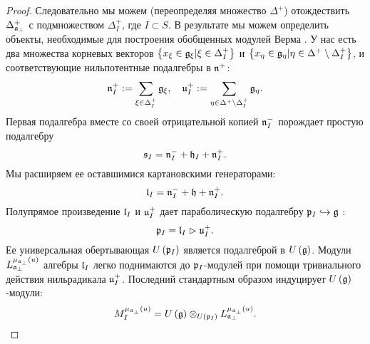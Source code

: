 \begin{proof}
Следовательно мы можем (переопределяя множество  $\Delta ^{+}$) отождествить $\Delta _{\frak{a}_{\perp }}^{+}$ с подмножеством  $\Delta _{I}^{+}$, где $I\subset S$. В результате мы можем определить объекты, необходимые для построения обобщенных модулей Верма \cite{lepowsky1977generalization,humphreys2008representations}. У нас есть два множества корневых векторов $\left\{ x_{\xi }\in \frak{g}_{\xi }|\xi \in \Delta _{I}^{+}\right\}
$ и $\left\{ x_{\eta }\in \frak{g}_{\eta }|\eta \in \Delta ^{+}\setminus
\Delta _{I}^{+}\right\} $, и соответствующие нильпотентные подалгебры в  $\frak{n}%
^{+}$:
\begin{equation*}
\frak{n}_{I}^{+}:=\sum_{\xi \in \Delta _{I}^{+}}\frak{g}_{\xi },\quad
\frak{u}_{I}^{+}:=\sum_{\eta \in \Delta ^{+}\setminus \Delta _{I}^{+}}\frak{g}%
_{\eta }.
\end{equation*}
Первая подалгебра вместе со своей отрицательной копией  $\frak{n}%
_{I}^{-} $ порождает простую подалгебру 
\begin{equation*}
\frak{s}_{I}=\frak{n}_{I}^{-}+\frak{h}_{I}+\frak{n}_{I}^{+}.
\end{equation*}
Мы расширяем ее оставшимися картановскими генераторами:
\begin{equation*}
\frak{l}_{I}=\frak{n}_{I}^{-}+\frak{h}+\frak{n}_{I}^{+}.
\end{equation*}
Полупрямое произведение  $\frak{l}_{I}$ и $\frak{u}_{I}^{+}$ дает параболическую подалгебру $\frak{p}_{I}\hookrightarrow \frak{g}$ :
\begin{equation}
\frak{p}_{I}=\frak{l}_{I}\vartriangleright \frak{u}_{I}^{+}.
\label{paralolic subalg}
\end{equation}
Ее универсальная обертывающая $U\left( \frak{p}_{I}\right) $ является подалгеброй в  $%
U\left( \frak{g}\right) $. Модули  $L_{\frak{a}_{\perp }}^{\mu _{%
\frak{a}_{\perp }}\left( u\right) }$ алгебры  $\frak{l}_{I}$ легко поднимаются до  $\frak{p}_{I}$-модулей при помощи тривиального действия нильрадикала $\frak{u}_{I}^{+}$. Последний стандартным образом индуцирует $U\left( \frak{g}\right) $-модули:
\begin{equation*}
M_{I}^{\mu _{\frak{a}_{\perp }}\left( u\right) }=U\left( \frak{g}\right)
\otimes _{U\left( \frak{p}_{I}\right) }L_{\frak{a}_{\perp }}^{\mu _{\frak{a}%
_{\perp }}\left( u\right) }.
\end{equation*}


\end{proof}
